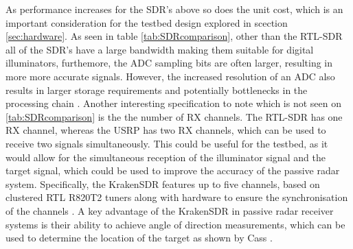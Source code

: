 As performance increases for the SDR's above so does the unit cost, which is an important consideration for the testbed design explored in scection \ref*{sec:hardware}. As seen in table \ref{tab:SDRcomparison}, other than the RTL-SDR all of the SDR's have a large bandwidth making them suitable for digital illuminators, furthemore, the ADC sampling bits are often larger, resulting in more more accurate signals. However, the increased resolution of an ADC also results in larger storage requirements and potentially bottlenecks in the processing chain \cite{SDRmoduleComparison}. Another interesting specification to note which is not seen on \ref*{tab:SDRcomparison} is the the number of RX channels. The RTL-SDR has one RX channel, whereas the USRP has two RX channels, which can be used to receive two signals simultaneously. This could be useful for the testbed, as it would allow for the simultaneous reception of the illuminator signal and the target signal, which could be used to improve the accuracy of the passive radar system. Specifically, the KrakenSDR features up to five channels, based on clustered RTL R820T2 tuners along with hardware to ensure the synchronisation of the channels \cite{KrakenSDR}. A key advantage of the KrakenSDR in passive radar receiver systems is their ability to achieve angle of direction measurements, which can be used to determine the location of the target as shown by Cass \cite{KrakenSDR}.

